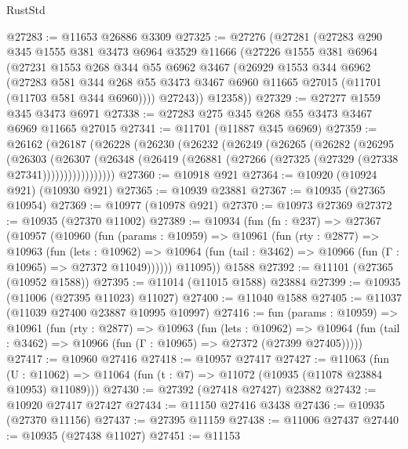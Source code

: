\begin{lexlean}{RustStd}
\begin{coremodule}
{{{{{{{{{{{{{{{{{{{@27283 := @11653 @26886 @3309
@27325 := @27276
    (@27281
      (@27283
        @290
        @345
        @1555
        @381
        @3473
        @6964
        @3529
        @11666
        (@27226
          @1555
          @381
          @6964
          (@27231
            @1553
            @268
            @344
            @55
            @6962
            @3467
            (@26929
              @1553
              @344
              @6962
              (@27283
                @581
                @344
                @268
                @55
                @3473
                @3467
                @6960
                @11665
                @27015
                (@11701 (@11703 @581 @344 @6960))))
            @27243))
        @12358))
@27329 := @27277 @1559 @345 @3473 @6971
@27338 := @27283 @275 @345 @268 @55 @3473 @3467 @6969 @11665 @27015
@27341 := @11701 (@11887 @345 @6969)
@27359 := @26162
    (@26187
      (@26228
        (@26230
          (@26232
            (@26249
              (@26265
                (@26282
                  (@26295
                    (@26303
                      (@26307
                        (@26348
                          (@26419 (@26881 (@27266 (@27325 (@27329 (@27338 @27341)))))))))))))))))
@27360 := @10918 @921
@27364 := @10920 (@10924 @921) (@10930 @921)
@27365 := @10939 @23881
@27367 := @10935 (@27365 @10954)
@27369 := @10977 (@10978 @921)
@27370 := @10973 @27369
@27372 := @10935 (@27370 @11002)
@27389 := @10934
    (fun (fn : @237) =>
    @27367
      (@10957
        (@10960
          (fun (params : @10959) =>
          @10961
            (fun (rty : @2877) =>
            @10963
              (fun (lets : @10962) =>
              @10964 (fun (tail : @3462) => @10966 (fun (Γ : @10965) => @27372 @11049))))))
        @11095))
    @1588
@27392 := @11101 (@27365 (@10952 @1588))
@27395 := @11014 (@11015 @1588) @23884
@27399 := @10935 (@11006 (@27395 @11023) @11027)
@27400 := @11040 @1588
@27405 := @11037 (@11039 @27400 @23887 @10995 @10997)
@27416 := fun (params : @10959) =>
  @10961
    (fun (rty : @2877) =>
    @10963
      (fun (lets : @10962) =>
      @10964 (fun (tail : @3462) => @10966 (fun (Γ : @10965) => @27372 (@27399 @27405)))))
@27417 := @10960 @27416
@27418 := @10957 @27417
@27427 := @11063
    (fun (U : @11062) => @11064 (fun (t : @7) => @11072 (@10935 (@11078 @23884 @10953) @11089)))
@27430 := @27392 (@27418 @27427) @23882
@27432 := @10920 @27417 @27427
@27434 := @11150 @27416 @3438
@27436 := @10935 (@27370 @11156)
@27437 := @27395 @11159
@27438 := @11006 @27437
@27440 := @10935 (@27438 @11027)
@27451 := @11153
}}}}}}}}}}}}}}}}}}}
\end{coremodule}
\end{lexlean}
